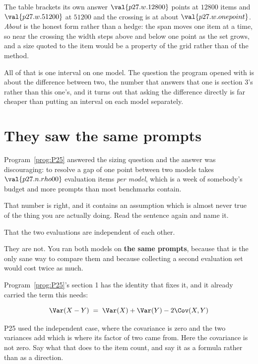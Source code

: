 \begin{fr}
The table brackets its own answer \dash{} $\val{p27.w.12800}$ points at
$\num{12800}$ items and $\val{p27.w.51200}$ at $\num{51200}$ \dash{} and the
crossing is at about $\val{p27.w.onepoint}$. \emph{About} is the honest form
rather than a hedge: the span moves one item at a time, so near the crossing
the width steps above and below one point as the set grows, and a size quoted
to the item would be a property of the grid rather than of the method.

All of that is one interval on one model. The question the program opened
with is about the difference between two, the number that answers that one is
section 3's rather than this one's, and it turns out that asking the
difference directly is far cheaper than putting an interval on each model
separately.
\end{fr}

\section{They saw the same prompts}
\label{sec:P27-paired}

\begin{fr}
Program~\ref{prog:P25} answered the sizing question and the answer was
discouraging: to resolve a gap of one point between two models takes
$\val{p27.n.rho00}$ evaluation items \emph{per model}, which is a week of
somebody's budget and more prompts than most benchmarks contain.

That number is right, and it contains an assumption which is almost never
true of the thing you are actually doing. Read the sentence again and name
it.
\dotline
\nextframe
\end{fr}

\begin{fr}
\begin{ansblock}
That the two evaluations are independent of each other.
\end{ansblock}

They are not. You ran both models on \textbf{the same prompts}, because that
is the only sane way to compare them and because collecting a second
evaluation set would cost twice as much.

Program~\ref{prog:P25}'s section 1 has the identity that fixes it, and it
already carried the term this needs:

\[ \Var(X - Y) \;=\; \Var(X) + \Var(Y) - 2\Cov(X, Y) \]

P25 used the independent case, where the covariance is zero and the two
variances add \dash{} which is where its factor of two came from. Here the
covariance is not zero. Say what that does to the item count, and say it as
a formula rather than as a direction.
\dotline
\nextframe
\end{fr}

